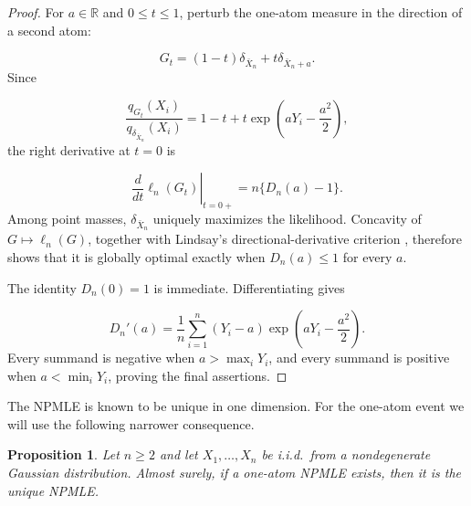 \documentclass[11pt]{article}
\newtheorem{proposition}[theorem]{Proposition}
\theoremstyle{definition}
\numberwithin{equation}{section}
\newcommand{\R}{\mathbb{R}}
\begin{document}
\begin{proof}
For \(a\in\R\) and \(0\le t\le1\), perturb the one-atom measure in the
direction of a second atom:

\[
    G_t=(1-t)\delta_{\bar X_n}+t\delta_{\bar X_n+a}.
\]
Since

\[
 \frac{q_{G_t}(X_i)}{q_{\delta_{\bar X_n}}(X_i)}
 =1-t+t\exp\left(aY_i-\frac{a^2}{2}\right),
\]
the right derivative at \(t=0\) is

\[
 \left.\frac{d}{dt}\ell_n(G_t)\right|_{t=0+}
 =n\{D_n(a)-1\}.
\]
Among point masses, \(\delta_{\bar X_n}\) uniquely maximizes the likelihood.
Concavity of \(G\mapsto\ell_n(G)\), together with Lindsay's
directional-derivative criterion \cite{lindsay1983geometryA}, therefore shows
that it is globally optimal exactly when \(D_n(a)\le1\) for every \(a\).

The identity \(D_n(0)=1\) is immediate. Differentiating gives

\[
    D_n'(a)=\frac1n\sum_{i=1}^n
      (Y_i-a)\exp\left(aY_i-\frac{a^2}{2}\right).
\]
Every summand is negative when \(a>\max_iY_i\), and every summand is positive
when \(a<\min_iY_i\), proving the final assertions.
\end{proof}

The NPMLE is known to be unique in one dimension. For the one-atom event we
will use the following narrower consequence.
\begin{proposition}
\label{prop:one-atom-unique}
Let \(n\ge2\) and let \(X_1,\dots,X_n\) be i.i.d.\ from a nondegenerate
Gaussian distribution. Almost surely, if a one-atom NPMLE exists, then it is
the unique NPMLE.
\end{proposition}
\end{document}
